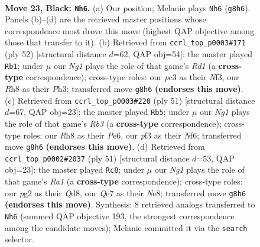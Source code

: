 \documentclass[11pt]{article}
\begin{document}
\clearpage

\begin{figure}[p]\centering
\begin{subfigure}{0.46\textwidth}\centering
\resizebox{\linewidth}{!}{%
\newchessgame
\chessboard[
  setfen={1k4nr/p1p1q1pp/1p2p3/2p5/5Q2/2P2P2/1P4PP/2K1R3 b - - 1 23},
  showmover=false,
  pgfstyle=straightmove, color=movearrow, markmove={g8-h6}
]}
\caption{}
\end{subfigure}\hfill
\begin{subfigure}{0.46\textwidth}\centering
\resizebox{\linewidth}{!}{%
\newchessgame
\chessboard[
  setfen={3rq1k1/5pp1/p6p/2p5/PbP1P3/3P1N1P/2Q3P1/3R2K1 w - - 0 27},
  showmover=false,
  pgfstyle=straightmove, color=movearrow, markmove={d1-b1}
]}
\caption{}
\end{subfigure}
\\[4pt]
\begin{subfigure}{0.46\textwidth}\centering
\resizebox{\linewidth}{!}{%
\newchessgame
\chessboard[
  setfen={6k1/p2q1pp1/1r2pn1p/Q7/3P4/4P3/3N1PPP/2R3K1 b - - 2 26},
  showmover=false,
  pgfstyle=straightmove, color=movearrow, markmove={b6-b5}
]}
\caption{}
\end{subfigure}\hfill
\begin{subfigure}{0.46\textwidth}\centering
\resizebox{\linewidth}{!}{%
\newchessgame
\chessboard[
  setfen={r2qn1k1/p4pp1/1p2p2p/4Q3/3N4/P3PP2/1P4PP/2R2K2 b - - 0 26},
  showmover=false,
  pgfstyle=straightmove, color=movearrow, markmove={a8-c8}
]}
\caption{}
\end{subfigure}
\caption{\textbf{Move 23, Black: \texttt{Nh6}.} (a) Our position; Melanie plays \texttt{Nh6} (\texttt{g8h6}). Panels (b)--(d) are the retrieved master positions whose correspondence most drove this move (highest QAP objective among those that transfer to it). (b) Retrieved from \texttt{ccrl\_top\_p0003\#171} (ply 52) [structural distance $d$=62, QAP obj=54]: the master played \texttt{Rb1}; under $\mu$ our \emph{Ng1} plays the role of that game's \emph{Rd1} (a \textbf{cross-type} correspondence); cross-type roles: our \emph{p}c3 as their \emph{N}f3, our \emph{R}h8 as their \emph{P}h3; transferred move \texttt{g8h6} \textbf{(endorses this move)}. (c) Retrieved from \texttt{ccrl\_top\_p0003\#220} (ply 51) [structural distance $d$=67, QAP obj=23]: the master played \texttt{Rb5}; under $\mu$ our \emph{Ng1} plays the role of that game's \emph{Rb3} (a \textbf{cross-type} correspondence); cross-type roles: our \emph{R}h8 as their \emph{P}e6, our \emph{p}f3 as their \emph{N}f6; transferred move \texttt{g8h6} \textbf{(endorses this move)}. (d) Retrieved from \texttt{ccrl\_top\_p0002\#2037} (ply 51) [structural distance $d$=53, QAP obj=23]: the master played \texttt{Rc8}; under $\mu$ our \emph{Ng1} plays the role of that game's \emph{Ra1} (a \textbf{cross-type} correspondence); cross-type roles: our \emph{p}g2 as their \emph{Q}d8, our \emph{Q}e7 as their \emph{N}e8; transferred move \texttt{g8h6} \textbf{(endorses this move)}. Synthesis: 8 retrieved analogs transferred to \texttt{Nh6} (summed QAP objective 193, the strongest correspondence among the candidate moves); Melanie committed it via the \texttt{search} selector.}
\label{fig:thought-m45}
\end{figure}
\end{document}

